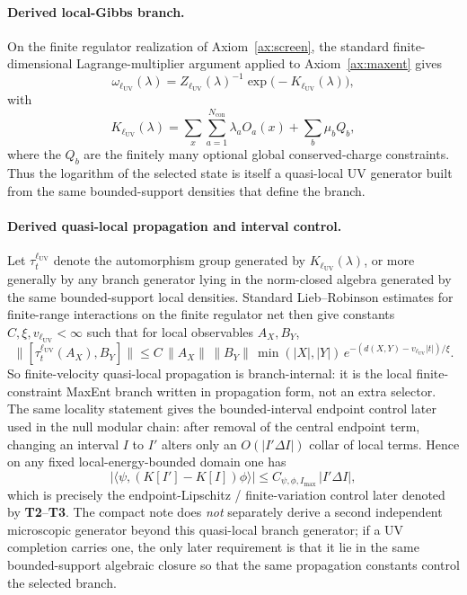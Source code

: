 \documentclass[11pt]{article}
\begin{document}
\paragraph{Derived local-Gibbs branch.}
On the finite regulator realization of Axiom~\ref{ax:screen}, the standard finite-dimensional Lagrange-multiplier argument applied to Axiom~\ref{ax:maxent} gives
\[
\omega_{\ell_{\mathrm{UV}}}(\lambda)
=
Z_{\ell_{\mathrm{UV}}}(\lambda)^{-1}\exp\!\bigl(-K_{\ell_{\mathrm{UV}}}(\lambda)\bigr),
\]
with
\[
K_{\ell_{\mathrm{UV}}}(\lambda)
=
\sum_x \sum_{a=1}^{N_{\mathrm{con}}}\lambda_a O_a(x)
+\sum_b \mu_b Q_b,
\]
where the \(Q_b\) are the finitely many optional global conserved-charge constraints. Thus the logarithm of the selected state is itself a quasi-local UV generator built from the same bounded-support densities that define the branch.

\paragraph{Derived quasi-local propagation and interval control.}
Let \(\tau_t^{\ell_{\mathrm{UV}}}\) denote the automorphism group generated by \(K_{\ell_{\mathrm{UV}}}(\lambda)\), or more generally by any branch generator lying in the norm-closed algebra generated by the same bounded-support local densities. Standard Lieb--Robinson estimates for finite-range interactions on the finite regulator net then give constants \(C,\xi,v_{\ell_{\mathrm{UV}}}<\infty\) such that for local observables \(A_X,B_Y\),
\[
\bigl\|[\tau_t^{\ell_{\mathrm{UV}}}(A_X),B_Y]\bigr\|
\le
C\,\|A_X\|\,\|B_Y\|\,\min(|X|,|Y|)\,
e^{-(d(X,Y)-v_{\ell_{\mathrm{UV}}}|t|)/\xi}.
\]
So finite-velocity quasi-local propagation is branch-internal: it is the local finite-constraint MaxEnt branch written in propagation form, not an extra selector. The same locality statement gives the bounded-interval endpoint control later used in the null modular chain: after removal of the central endpoint term, changing an interval \(I\) to \(I'\) alters only an \(O(|I'\Delta I|)\) collar of local terms. Hence on any fixed local-energy-bounded domain one has
\[
\left|\langle\psi,(K[I']-K[I])\phi\rangle\right|
\le
C_{\psi,\phi,I_{\max}}\,|I'\Delta I|,
\]
which is precisely the endpoint-Lipschitz / finite-variation control later denoted by \textbf{T2}--\textbf{T3}. The compact note does \emph{not} separately derive a second independent microscopic generator beyond this quasi-local branch generator; if a UV completion carries one, the only later requirement is that it lie in the same bounded-support algebraic closure so that the same propagation constants control the selected branch.
\end{document}
